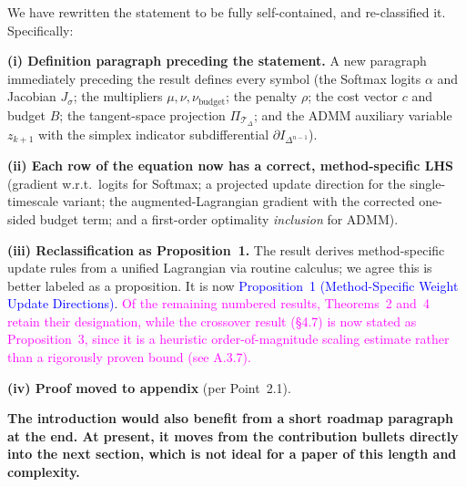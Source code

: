 \documentclass{article}
\newenvironment{QandA}{\begin{enumerate}[label=\bfseries\alph*.]\bfseries}
                      {\end{enumerate}}
\newenvironment{answered}{\par\normalfont}{}
\newcommand{\rtwo}[1]{\textcolor{blue}{#1}}      %
\newcommand{\audit}[1]{\textcolor{magenta}{#1}}  %
\begin{document}
\begin{answered}
We have rewritten the statement to be fully self-contained, and re-classified
it. Specifically:

\textbf{(i) Definition paragraph preceding the statement.}
A new paragraph immediately preceding the result defines every symbol
(the Softmax logits $\alpha$ and Jacobian $J_\sigma$; the multipliers
$\mu,\nu,\nu_{\text{budget}}$; the penalty $\rho$; the cost vector $c$ and
budget $B$; the tangent-space projection $\Pi_{\mathcal{T}_\Delta}$; and the
ADMM auxiliary variable $z_{k+1}$ with the simplex indicator subdifferential
$\partial I_{\Delta^{n-1}}$).

\textbf{(ii) Each row of the equation now has a correct, method-specific LHS}
(gradient w.r.t.\ logits for Softmax; a projected update direction for the
single-timescale variant; the augmented-Lagrangian gradient with the corrected
one-sided budget term; and a first-order optimality \emph{inclusion} for ADMM).

\textbf{(iii) Reclassification as Proposition~1.}
The result derives method-specific update rules from a unified Lagrangian via
routine calculus; we agree this is better labeled as a proposition. It is now
\rtwo{Proposition~1 (Method-Specific Weight Update Directions)}. \audit{Of the
remaining numbered results, Theorems~2 and~4 retain their designation, while
the crossover result (\S4.7) is now stated as Proposition~3, since it is a
heuristic order-of-magnitude scaling estimate rather than a rigorously proven
bound (see A.3.7).}

\textbf{(iv) Proof moved to appendix} (per Point~2.1).
\end{answered}

\begin{QandA}
The introduction would also benefit from a short roadmap paragraph at the end. At present, it moves from the contribution bullets directly into the next section, which is not ideal for a paper of this length and complexity.
\end{QandA}
\end{document}
